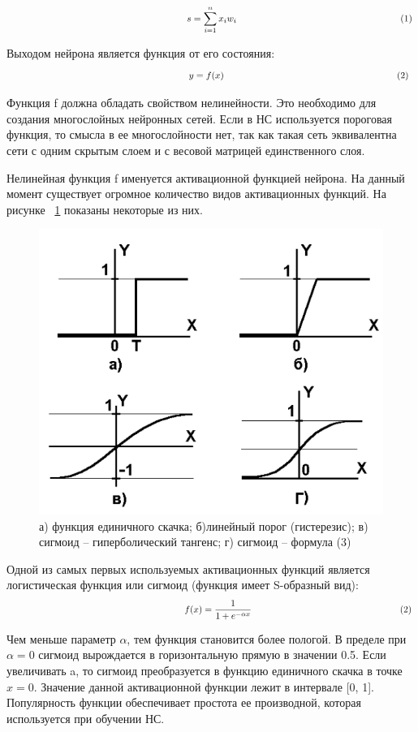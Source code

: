 \documentclass[a4paper,english,russian]{G2-105}
\begin{document}
\[
\ \hspace*{66mm} s = \sum_{i=1}^n x_i w_i \hspace*{62mm} (1)
\] 
\par Выходом нейрона является функция от его состояния:
\[
\ \hspace*{66mm} y = f(x) \hspace*{66mm} (2)
\] 
\par Функция f должна обладать свойством нелинейности. Это необходимо для создания многослойных нейронных сетей. Если в НС используется пороговая функция, то смысла в ее многослойности нет, так как такая сеть эквивалентна сети с одним скрытым слоем и с весовой матрицей единственного слоя. 
\par Нелинейная функция f именуется активационной функцией нейрона. На данный момент существует огромное количество видов активационных функций. На рисунке ~\ref{activation_func} показаны некоторые из них.
\begin{figure}
    \includegraphics[width=0.6\linewidth]{activation_func.png}
    \caption{а) функция единичного скачка; б)линейный порог (гистерезис); в) сигмоид – гиперболический тангенс; г) сигмоид – формула (3)}
	\label{activation_func}
\end{figure}
\par Одной из самых первых используемых активационных функций является логистическая функция или сигмоид (функция имеет S-образный вид): 
\[
\ \hspace*{66mm} f(x) = \frac{1}{1 + e^{- \alpha x}}\ \hspace*{56mm} (2)
\] 
\par Чем меньше параметр $\alpha$, тем функция становится более пологой. В пределе при $\alpha=0$ сигмоид вырождается в горизонтальную прямую в значении 0.5. Если увеличивать a, то сигмоид преобразуется в функцию единичного скачка в точке $x=0$. Значение данной активационной функции лежит в интервале [0, 1]. Популярность функции обеспечивает простота ее производной, которая используется при обучении НС. 
\end{document}
